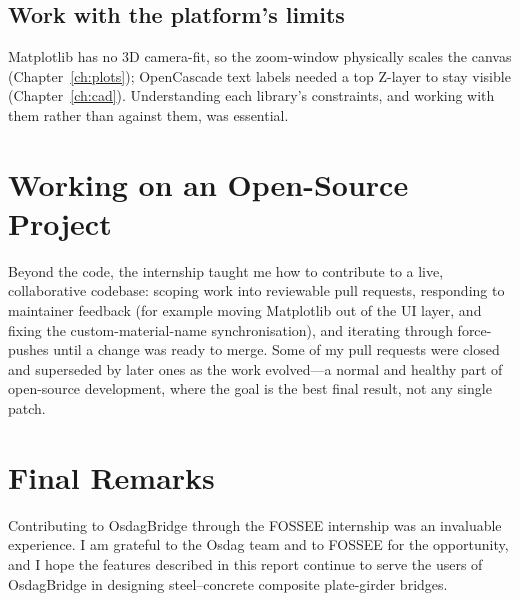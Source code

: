 \subsection{Work with the platform's limits}
Matplotlib has no 3D camera-fit, so the zoom-window physically scales the canvas
(Chapter~\ref{ch:plots}); OpenCascade text labels needed a top Z-layer to stay visible
(Chapter~\ref{ch:cad}). Understanding each library's constraints, and working with them rather
than against them, was essential.

\section{Working on an Open-Source Project}
Beyond the code, the internship taught me how to contribute to a live, collaborative codebase:
scoping work into reviewable pull requests, responding to maintainer feedback (for example moving
Matplotlib out of the UI layer, and fixing the custom-material-name synchronisation), and
iterating through force-pushes until a change was ready to merge. Some of my pull requests were
closed and superseded by later ones as the work evolved---a normal and healthy part of
open-source development, where the goal is the best final result, not any single patch.

\section{Final Remarks}
Contributing to OsdagBridge through the FOSSEE internship was an invaluable experience. I am
grateful to the Osdag team and to FOSSEE for the opportunity, and I hope the features described
in this report continue to serve the users of OsdagBridge in designing steel--concrete composite
plate-girder bridges.
